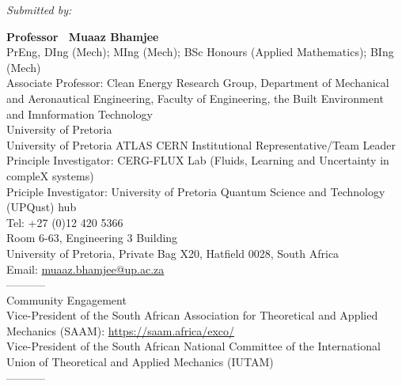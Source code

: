 \documentclass[11pt,a4paper]{article}
\begin{document}
\vspace{20pt}
\newpage

\noindent\textit{Submitted by:}

\vspace{8pt}
\noindent\textbf{Professor \ Muaaz Bhamjee}\\
PrEng, DIng (Mech); MIng (Mech); BSc Honours (Applied Mathematics); BIng (Mech) \\
Associate Professor: Clean Energy Research Group, Department of Mechanical and Aeronautical Engineering, Faculty of Engineering, the Built Environment and Imnformation Technology \\
University of Pretoria\\
University of Pretoria ATLAS CERN Institutional Representative/Team Leader \\
Principle Investigator: CERG-FLUX Lab (Fluids, Learning and Uncertainty in compleX systems) \\
Priciple Investigator: University of Pretoria Quantum Science and Technology (UPQust) hub \\
Tel:  +27 (0)12 420 5366 \\
Room 6-63,  Engineering 3 Building \\
University of Pretoria, Private Bag X20, Hatfield 0028, South Africa \\
Email: \href{mailto:muaaz.bhamjee@up.ac.za}{muaaz.bhamjee@up.ac.za} \\

----------- \\
Community Engagement \\
Vice-President of the South African Association for Theoretical and Applied Mechanics (SAAM): \url{https://saam.africa/exco/} \\
Vice-President of the South African National Committee of the International Union of Theoretical and Applied Mechanics (IUTAM) \\
----------- \\
\end{document}
